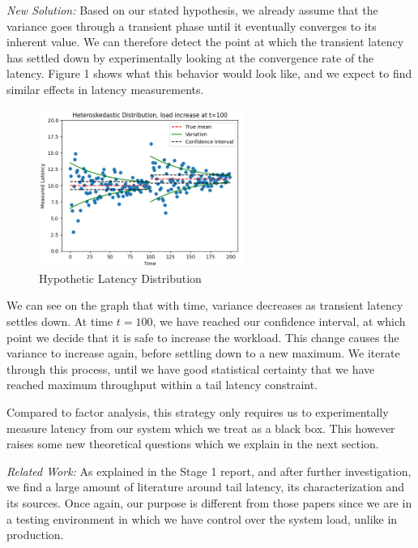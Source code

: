 \documentclass[12pt]{article}
\begin{document}
\noindent \textit{New Solution:} Based on our stated hypothesis, we already assume that the variance goes through a transient phase until it eventually converges to its inherent value. We can therefore detect the point at which the transient latency has settled down by experimentally looking at the convergence rate of the latency. Figure 1 shows what this behavior would look like, and we expect to find similar effects in latency measurements. 

\clearpage
\begin{figure}[H]
  \centering
  \includegraphics[width=0.6\textwidth]{distrib.png}
  \caption{Hypothetic Latency Distribution}
  \label{fig:sample}
\end{figure}

\noindent We can see on the graph that with time, variance decreases as transient latency settles down. At time $t=100$, we have reached our confidence interval, at which point we decide that it is safe to increase the workload. This change causes the variance to increase again, before settling down to a new maximum. We iterate through this process, until we have good statistical certainty that we have reached maximum throughput within a tail latency constraint. 

\noindent Compared to factor analysis, this strategy only requires us to experimentally measure latency from our system which we treat as a black box. This however raises some new theoretical questions which we explain in the next section.

\singlespacing

\noindent \textit{Related Work:} As explained in the Stage 1 report, and after further investigation, we find a large amount of literature around tail latency, its characterization and its sources. Once again, our purpose is different from those papers since we are in a testing environment in which we have control over the system load, unlike in production.
\end{document}
